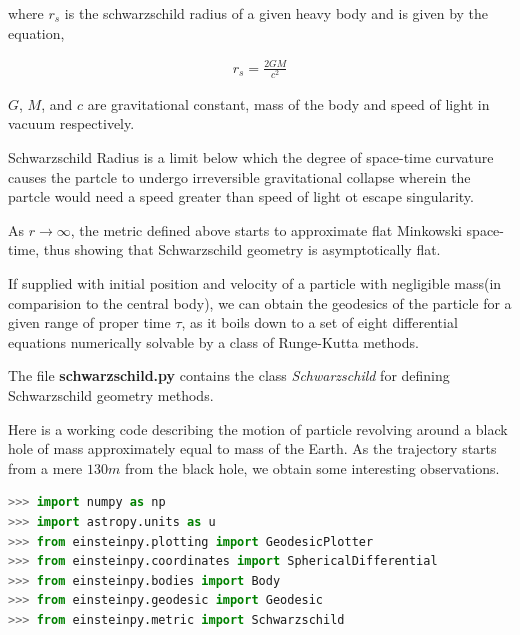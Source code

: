 \documentclass{aastex63}
\begin{document}
where $r_s$ is the schwarzschild radius of a given heavy body and is given by the equation,

\begin{gather}
r_s = \frac{2GM}{c^2}
\end{gather}

$G$, $M$, and $c$ are gravitational constant, mass of the body and speed of light in vacuum respectively.

Schwarzschild Radius is a limit below which the degree of space-time curvature causes the partcle to undergo irreversible gravitational collapse wherein the partcle would need a speed greater than speed of light ot escape singularity.

As $r \to \infty$, the metric defined above starts to approximate flat Minkowski space-time, thus showing that Schwarzschild geometry is asymptotically flat. 

If supplied with initial position and velocity of a particle with negligible mass(in comparision to the central body), we can obtain the geodesics of the particle for a given range of proper time $\tau$, as it boils down to a set of eight differential equations numerically solvable by a class of Runge-Kutta methods.

The file \textbf{schwarzschild.py} contains the class \textit{Schwarzschild} for defining Schwarzschild geometry methods.

Here is a working code describing the motion of particle revolving around a black hole of mass approximately equal to mass of the Earth. As the trajectory starts from a mere $130m$ from the black hole, we obtain some interesting observations.

\begin{lstlisting}[language=Python, caption=Importing the required modules]
>>> import numpy as np
>>> import astropy.units as u
>>> from einsteinpy.plotting import GeodesicPlotter
>>> from einsteinpy.coordinates import SphericalDifferential
>>> from einsteinpy.bodies import Body
>>> from einsteinpy.geodesic import Geodesic
>>> from einsteinpy.metric import Schwarzschild
\end{lstlisting}
\end{document}
